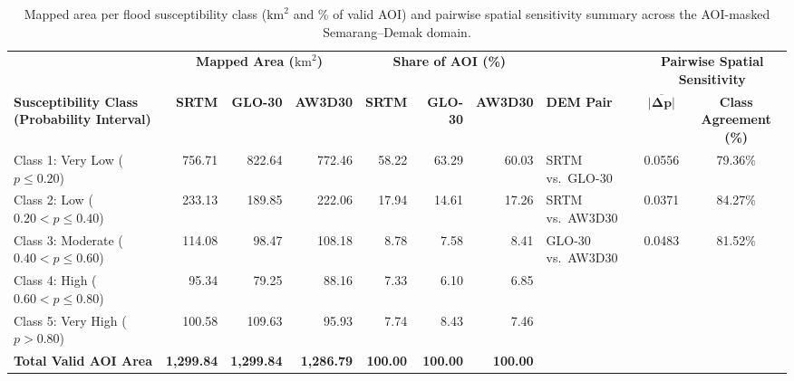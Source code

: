\documentclass[11pt,twoside]{article}
\begin{document}
\begin{table}[!htbp]
\small
\centering
\caption{Mapped area per flood susceptibility class ($\text{km}^2$ and \% of valid AOI) and pairwise spatial sensitivity summary across the AOI-masked Semarang--Demak domain.}
\label{tab:spatial-sensitivity}
\begin{adjustbox}{max width=\textwidth}
\begin{tabular}{l rrr rrr l cc}
\toprule
& \multicolumn{3}{c}{\textbf{Mapped Area ($\text{km}^2$)}} & \multicolumn{3}{c}{\textbf{Share of AOI (\%)}} & & \multicolumn{2}{c}{\textbf{Pairwise Spatial Sensitivity}} \\
\cmidrule(lr){2-4} \cmidrule(lr){5-7} \cmidrule(lr){9-10}
\textbf{Susceptibility Class (Probability Interval)} & \textbf{SRTM} & \textbf{GLO-30} & \textbf{AW3D30} & \textbf{SRTM} & \textbf{GLO-30} & \textbf{AW3D30} & \textbf{DEM Pair} & $\boldsymbol{\overline{|\Delta p|}}$ & \textbf{Class Agreement (\%)} \\
\midrule
Class 1: Very Low ($p \le 0.20$) & 756.71 & 822.64 & 772.46 & 58.22 & 63.29 & 60.03 & SRTM vs.\ GLO-30 & 0.0556 & 79.36\% \\
Class 2: Low ($0.20 < p \le 0.40$) & 233.13 & 189.85 & 222.06 & 17.94 & 14.61 & 17.26 & SRTM vs.\ AW3D30 & 0.0371 & 84.27\% \\
Class 3: Moderate ($0.40 < p \le 0.60$) & 114.08 & 98.47 & 108.18 & 8.78 & 7.58 & 8.41 & GLO-30 vs.\ AW3D30 & 0.0483 & 81.52\% \\
Class 4: High ($0.60 < p \le 0.80$) & 95.34 & 79.25 & 88.16 & 7.33 & 6.10 & 6.85 & & & \\
Class 5: Very High ($p > 0.80$) & 100.58 & 109.63 & 95.93 & 7.74 & 8.43 & 7.46 & & & \\
\midrule
\textbf{Total Valid AOI Area} & \textbf{1,299.84} & \textbf{1,299.84} & \textbf{1,286.79} & \textbf{100.00} & \textbf{100.00} & \textbf{100.00} & & & \\
\bottomrule
\end{tabular}
\end{adjustbox}
\end{table}
\end{document}

